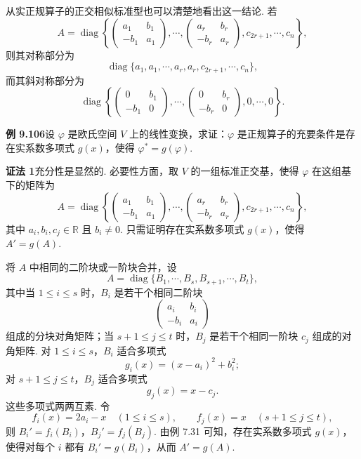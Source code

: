 \documentclass[UTF8, 12pt, fontset=fandol, oneside]{ctexart}
\begin{document}
从实正规算子的正交相似标准型也可以清楚地看出这一结论. 若
\[
A=\operatorname{diag}\left\{
\begin{pmatrix}
a_1&b_1\\
-b_1&a_1
\end{pmatrix},\cdots,
\begin{pmatrix}
a_r&b_r\\
-b_r&a_r
\end{pmatrix},
c_{2r+1},\cdots,c_n
\right\},
\]
则其对称部分为
\[
\operatorname{diag}\{a_1,a_1,\cdots,a_r,a_r,c_{2r+1},\cdots,c_n\},
\]
而其斜对称部分为
\[
\operatorname{diag}\left\{
\begin{pmatrix}
0&b_1\\
-b_1&0
\end{pmatrix},\cdots,
\begin{pmatrix}
0&b_r\\
-b_r&0
\end{pmatrix},
0,\cdots,0
\right\}.
\]

\noindent\textbf{例 9.106}\quad 设 $\varphi$ 是欧氏空间 $V$ 上的线性变换，求证：$\varphi$ 是正规算子的充要条件是存在实系数多项式 $g(x)$，使得 $\varphi^*=g(\varphi)$.

\noindent\textbf{证法 1}\quad 充分性是显然的. 必要性方面，取 $V$ 的一组标准正交基，使得 $\varphi$ 在这组基下的矩阵为
\[
A=\operatorname{diag}\left\{
\begin{pmatrix}
a_1&b_1\\
-b_1&a_1
\end{pmatrix},\cdots,
\begin{pmatrix}
a_r&b_r\\
-b_r&a_r
\end{pmatrix},
c_{2r+1},\cdots,c_n
\right\},
\]
其中 $a_i,b_i,c_j\in\mathbb{R}$ 且 $b_i\ne0$. 只需证明存在实系数多项式 $g(x)$，使得 $A'=g(A)$.

将 $A$ 中相同的二阶块或一阶块合并，设
\[
A=\operatorname{diag}\{B_1,\cdots,B_s,B_{s+1},\cdots,B_t\},
\]
其中当 $1\le i\le s$ 时，$B_i$ 是若干个相同二阶块
\[
\begin{pmatrix}
a_i&b_i\\
-b_i&a_i
\end{pmatrix}
\]
组成的分块对角矩阵；当 $s+1\le j\le t$ 时，$B_j$ 是若干个相同一阶块 $c_j$ 组成的对角矩阵. 对 $1\le i\le s$，$B_i$ 适合多项式
\[
g_i(x)=(x-a_i)^2+b_i^2;
\]
对 $s+1\le j\le t$，$B_j$ 适合多项式
\[
g_j(x)=x-c_j.
\]
这些多项式两两互素. 令
\[
f_i(x)=2a_i-x\quad (1\le i\le s),\qquad f_j(x)=x\quad (s+1\le j\le t),
\]
则 $B_i'=f_i(B_i)$，$B_j'=f_j(B_j)$. 由例 7.31 可知，存在实系数多项式 $g(x)$，使得对每个 $i$ 都有 $B_i'=g(B_i)$，从而 $A'=g(A)$.
\end{document}
